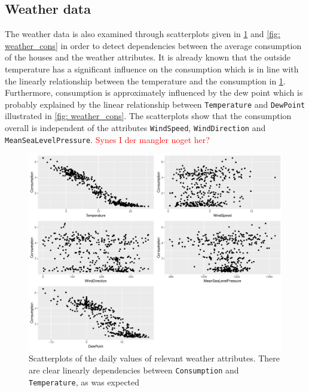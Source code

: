 
\subsection{Weather data}
The weather data is also examined through scatterplots given in \cref{fig: weatherpairs} and \cref{fig: weather_cons} in order to detect dependencies between the average consumption of the houses and the weather attributes. It is already known that the outside temperature has a significant influence on the consumption which is in line with the linearly relationship between the temperature and the consumption in \cref{fig: weatherpairs}. Furthermore, consumption is approximately influenced by the dew point which is probably explained by the linear relationship between \texttt{Temperature} and \texttt{DewPoint} illustrated in \cref{fig: weather_cons}. The scatterplots show that the consumption overall is independent of the attributes \texttt{WindSpeed}, \texttt{WindDirection} and \texttt{MeanSeaLevelPressure}. \textcolor{red}{Synes I der mangler noget her?} 
\begin{figure}
    \centering
    \includegraphics[width=1.\textwidth]{../../../figures/weatherpairs.pdf}
    \caption{Scatterplots of the daily values of relevant weather attributes. There are clear linearly dependencies between \texttt{Consumption} and \texttt{Temperature}, as was expected}
    \label{fig: weatherpairs}
\end{figure}

